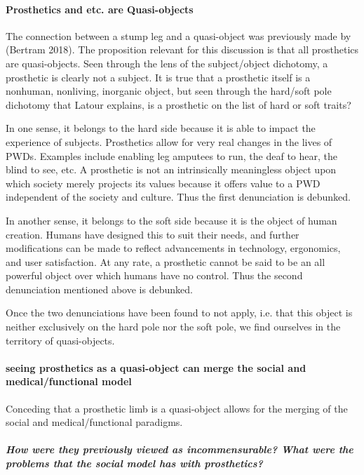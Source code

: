 \documentclass[a4paper]{article}
\begin{document}
\paragraph{Prosthetics and etc. are Quasi-objects}

The connection between a stump leg and a quasi-object was previously made by
(Bertram 2018). The proposition relevant for this discussion is that all
prosthetics are quasi-objects. Seen through the lens of the subject/object
dichotomy, a prosthetic is clearly not a subject. It is true that a prosthetic
itself is a nonhuman, nonliving, inorganic object, but seen through the
hard/soft pole dichotomy that Latour explains, is a prosthetic on the list of
hard or soft traits? 

In one sense, it belongs to the hard side because it is able to impact the
experience of subjects. Prosthetics allow for very real changes in the lives
of PWDs. Examples include enabling leg amputees to run, the deaf to hear, the
blind to see, etc. A prosthetic is not an intrinsically meaningless object
upon which society merely projects its values because it offers value to a PWD
independent of the society and culture. Thus the first denunciation is
debunked.

In another sense, it belongs to the soft side because it is the object of
human creation. Humans have designed this to suit their needs, and further
modifications can be made to reflect advancements in technology, ergonomics,
and user satisfaction. At any rate, a prosthetic cannot be said to be an all
powerful object over which humans have no control. Thus the second
denunciation mentioned above is debunked.

Once the two denunciations have been found to not apply, i.e. that this object
is neither exclusively on the hard pole nor the soft pole,  we find ourselves
in the territory of quasi-objects.


\paragraph{seeing prosthetics as a quasi-object can merge the social and
medical/functional model}

Conceding that a prosthetic limb is a quasi-object allows for the merging of
the social and medical/functional paradigms.




\subparagraph{How were they previously viewed as incommensurable? What were
the problems that the social model has with prosthetics?}
\end{document}
